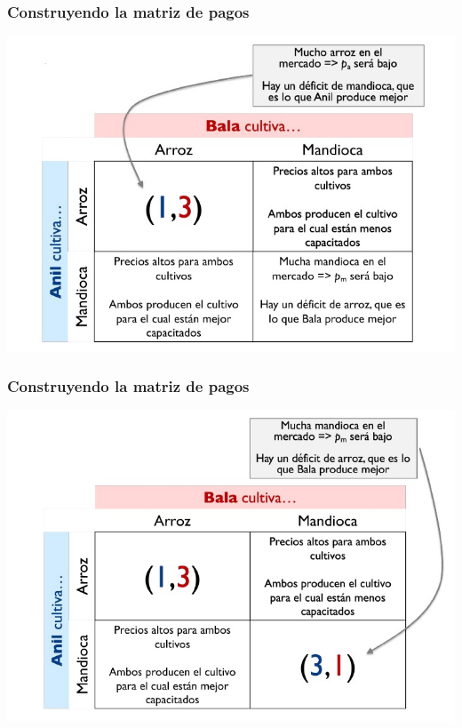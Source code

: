 \documentclass{beamer}
\begin{document}
\begin{frame}
\frametitle{ Construyendo la matriz de pagos}
\centering
\includegraphics[scale=0.6]{Slides Principios de Economia/Figures/Tema_03_8_bala.jpg}
\end{frame}

\begin{frame}
\frametitle{Construyendo la matriz de pagos}
\centering
\includegraphics[scale=0.6]{Slides Principios de Economia/Figures/Tema_03_9_bala.jpg}
\end{frame}
\end{document}
